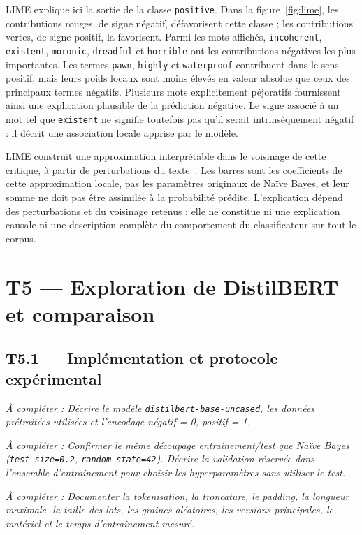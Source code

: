 \documentclass[11pt,a4paper]{article}
\newcommand{\acompleter}[1]{\par\noindent\textit{À compléter : #1}\par}
\begin{document}
LIME explique ici la sortie de la classe \texttt{positive}. Dans la
figure~\ref{fig:lime}, les contributions rouges, de signe négatif,
défavorisent cette classe ; les contributions vertes, de signe positif,
la favorisent. Parmi les mots affichés, \texttt{incoherent},
\texttt{existent}, \texttt{moronic}, \texttt{dreadful} et
\texttt{horrible} ont les contributions négatives les plus importantes.
Les termes \texttt{pawn}, \texttt{highly} et \texttt{waterproof}
contribuent dans le sens positif, mais leurs poids locaux sont moins
élevés en valeur absolue que ceux des principaux termes négatifs.
Plusieurs mots explicitement péjoratifs fournissent ainsi une explication
plausible de la prédiction négative. Le signe associé à un mot tel que
\texttt{existent} ne signifie toutefois pas qu'il serait intrinsèquement
négatif : il décrit une association locale apprise par le modèle.

LIME construit une approximation interprétable dans le voisinage de cette
critique, à partir de perturbations du texte~\cite{lime}. Les barres sont
les coefficients de cette approximation locale, pas les paramètres
originaux de Naïve Bayes, et leur somme ne doit pas être assimilée à la
probabilité prédite. L'explication dépend des perturbations et du
voisinage retenus ; elle ne constitue ni une explication causale ni une
description complète du comportement du classificateur sur tout le corpus.

\section*{T5 --- Exploration de DistilBERT et comparaison}
\subsection*{T5.1 --- Implémentation et protocole expérimental}
\acompleter{Décrire le modèle \texttt{distilbert-base-uncased}, les données prétraitées utilisées et l'encodage négatif = 0, positif = 1.}
\acompleter{Confirmer le même découpage entraînement/test que Naïve Bayes (\texttt{test\_size=0.2}, \texttt{random\_state=42}). Décrire la validation réservée dans l'ensemble d'entraînement pour choisir les hyperparamètres sans utiliser le test.}
\acompleter{Documenter la tokenisation, la troncature, le padding, la longueur maximale, la taille des lots, les graines aléatoires, les versions principales, le matériel et le temps d'entraînement mesuré.}
\end{document}
